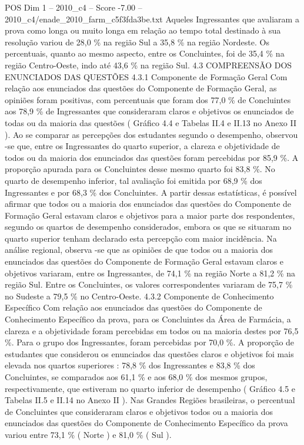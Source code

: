 \begin{textsample}{POS Dim 1 – 2010\_c4 – Score -7.00 – 2010\_c4/enade\_2010\_farm\_c5f3fda3be.txt}
Aqueles Ingressantes que avaliaram a prova como longa ou muito longa em relação ao tempo total destinado à sua resolução variou de 28,0 \% na região Sul a 35,8 \% na região Nordeste.
Os percentuais, quanto ao mesmo aspecto, entre os Concluintes, foi de 35,4 \% na região Centro-Oeste, indo até 43,6 \% na região Sul. 4.3 COMPREENSÃO DOS ENUNCIADOS DAS QUESTÕES 4.3.1 Componente de Formação Geral Com relação aos enunciados das questões do Componente de Formação Geral, as opiniões foram positivas, com percentuais que foram dos 77,0 \% de Concluintes aos 78,9 \% de Ingressantes que consideraram claros e objetivos os enunciados de todas ou da maioria das questões ( Gráfico 4.4 e Tabelas II.4 e II.13 no Anexo II ).
Ao se comparar as percepções dos estudantes segundo o desempenho, observou -se que, entre os Ingressantes do quarto superior, a clareza e objetividade de todos ou da maioria dos enunciados das questões foram percebidas por 85,9 \%.
A proporção apurada para os Concluintes desse mesmo quarto foi 83,8 \%.
No quarto de desempenho inferior, tal avaliação foi emitida por 68,9 \% dos Ingressantes e por 68,3 \% dos Concluintes.
A partir dessas estatísticas, é possível afirmar que todos ou a maioria dos enunciados das questões do Componente de Formação Geral estavam claros e objetivos para a maior parte dos respondentes, segundo os quartos de desempenho considerados, embora os que se situaram no quarto superior tenham declarado esta percepção com maior incidência.
Na análise regional, observa -se que as opiniões de que todos ou a maioria dos enunciados das questões do Componente de Formação Geral estavam claros e objetivos variaram, entre os Ingressantes, de 74,1 \% na região Norte a 81,2 \% na região Sul.
Entre os Concluintes, os valores correspondentes variaram de 75,7 \% no Sudeste a 79,5 \% no Centro-Oeste. 4.3.2 Componente de Conhecimento Específico Com relação aos enunciados das questões do Componente de Conhecimento Específico da prova, para os Concluintes da Área de Farmácia, a clareza e a objetividade foram percebidas em todos ou na maioria destes por 76,5 \%.
Para o grupo dos Ingressantes, foram percebidas por 70,0 \%.
A proporção de estudantes que considerou os enunciados das questões claros e objetivos foi mais elevada nos quartos superiores : 78,8 \% dos Ingressantes e 83,8 \% dos Concluintes, se comparados aos 61,1 \% e aos 68,0 \% dos mesmos grupos, respectivamente, que estiveram no quarto inferior de desempenho ( Gráfico 4.5 e Tabelas II.5 e II.14 no Anexo II ).
Nas Grandes Regiões brasileiras, o percentual de Concluintes que consideraram claros e objetivos todos ou a maioria dos enunciados das questões do Componente de Conhecimento Específico da prova variou entre 73,1 \% ( Norte ) e 81,0 \% ( Sul ).

\end{textsample}
